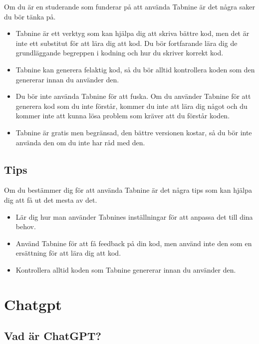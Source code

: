 Om du är en studerande som funderar på att använda Tabnine är det några
saker du bör tänka på.

\begin{itemize}
\tightlist
\item
  Tabnine är ett verktyg som kan hjälpa dig att skriva bättre kod, men
  det är inte ett substitut för att lära dig att kod. Du bör fortfarande
  lära dig de grundläggande begreppen i kodning och hur du skriver
  korrekt kod.
\item
  Tabnine kan generera felaktig kod, så du bör alltid kontrollera koden
  som den genererar innan du använder den.
\item
  Du bör inte använda Tabnine för att fuska. Om du använder Tabnine för
  att generera kod som du inte förstår, kommer du inte att lära dig
  något och du kommer inte att kunna lösa problem som kräver att du
  förstår koden.
\item
  Tabnine är gratis men begränsad, den bättre versionen kostar, så du
  bör inte använda den om du inte har råd med den.
\end{itemize}

\hypertarget{tips}{%
\subsection{Tips}\label{tips}}

Om du bestämmer dig för att använda Tabnine är det några tips som kan
hjälpa dig att få ut det mesta av det.

\begin{itemize}
\tightlist
\item
  Lär dig hur man använder Tabnines inställningar för att anpassa det
  till dina behov.
\item
  Använd Tabnine för att få feedback på din kod, men använd inte den som
  en ersättning för att lära dig att kod.
\item
  Kontrollera alltid koden som Tabnine genererar innan du använder den.
\end{itemize}

\hypertarget{chatgpt}{%
\section{Chatgpt}\label{chatgpt}}

\hypertarget{vad-uxe4r-chatgpt}{%
\subsection{Vad är ChatGPT?}\label{vad-uxe4r-chatgpt}}

